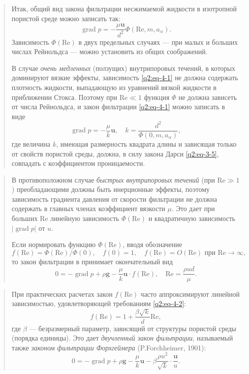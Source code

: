 \documentclass[12pt,a4paper]{article}
\DeclareMathOperator{\grad}{grad}
\newcommand{\Rey}{\mathrm{Re}}
\newenvironment{textquote}{\begin{quote}\sloppy}{\end{quote}}
\begin{document}
\begin{textquote}
Итак, общий вид закона фильтрации несжимаемой жидкости в изотропной пористой среде можно записать так:
\begin{equation}
\grad p=-\frac{\mu\boldsymbol{u}}{d^2}\Phi(\Rey,m,a_\alpha).
\tag{4.1}\label{q2:eq-4-1}
\end{equation}
Зависимость $\Phi(\Rey)$ в двух предельных случаях --- при малых и больших числах Рейнольдса --- можно установить из общих соображений.

В случае \textit{очень медленных} (ползущих) внутрипоровых течений, в которых доминируют вязкие эффекты, зависимость \eqref{q2:eq-4-1}
не должна содержать плотность жидкости, выпадающую из уравнений вязкой жидкости в приближении Стокса. Поэтому при $\Rey\ll1$ функция $\Phi$ не должна зависеть от числа Рейнольдса, и закон фильтрации \eqref{q2:eq-4-1} можно записать в виде
\[
\grad p=-\frac{\mu}{k}\boldsymbol{u},\quad k=\frac{d^2}{\Phi(0,m,a_\alpha)},
\]
где величина $k$, имеющая размерность квадрата длины и зависящая только от свойств пористой среды, должна, в силу закона Дарси \eqref{q2:eq-3-5}, совпадать с коэффициентом проницаемости.
\end{textquote}

\begin{textquote}
В противоположном случае \textit{быстрых внутрипоровых течений} (при $\Rey\gg1$) преобладающими должны быть инерционные эффекты, поэтому зависимость градиента давления от скорости фильтрации не должна содержать в главных членах коэффициент вязкости $\mu$. Это дает при больших $\Rey$ линейную зависимость $\Phi(\Rey)$ и квадратичную зависимость $|\grad p|$ от $u$.

Если нормировать функцию $\Phi(\Rey)$, вводя обозначение
\begin{equation}
f(\Rey)=\Phi(\Rey)/\Phi(0),\quad f(0)=1,\quad f(\Rey)=O(\Rey)\text{ при }\Rey\to\infty,
\tag{4.2}\label{q2:eq-4-2}
\end{equation}
то закон фильтрации в принимает окончательный вид
\[
0=-\grad p+\rho\boldsymbol{g}-\frac{\mu}{k}\boldsymbol{u}\cdot f(\Rey),\quad \Rey=\frac{\rho ud}{\mu}.
\]
\end{textquote}

\begin{textquote}
При практических расчетах закон $f(\Rey)$ часто аппроксимируют линейной зависимостью, удовлетворяющей требованиям \eqref{q2:eq-4-2}:
\[
f(\Rey)=1+\frac{\beta\sqrt{k}}{d}\Rey,
\]
где $\beta$ --- безразмерный параметр, зависящий от структуры пористой среды (порядка единицы). Это дает \textit{двучленный закон фильтрации}, называемый также \textit{законом фильтрации Форхгеймера} (P.Forchheimer, 1901):
\begin{equation}
0=-\grad p+\rho\boldsymbol{g}-\frac{\mu}{k}\boldsymbol{u}-\beta\frac{\rho u^2}{\sqrt{k}}\cdot\frac{\boldsymbol{u}}{u}.
\tag{4.3}\label{q2:eq-4-3}
\end{equation}
\end{textquote}
\end{document}
